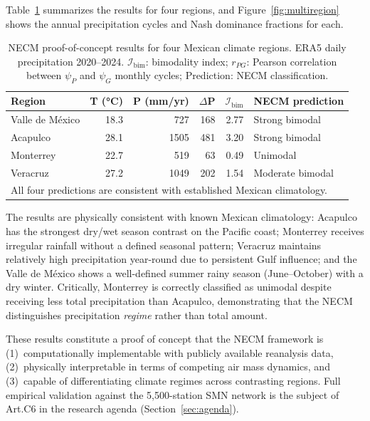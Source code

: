 \documentclass[12pt,a4paper]{article}
\begin{document}
Table~\ref{tab:proof_of_concept} summarizes the results for four
regions, and Figure~\ref{fig:multiregion} shows the annual precipitation
cycles and Nash dominance fractions for each.

\begin{table}[ht]
\centering
\small
\caption{NECM proof-of-concept results for four Mexican climate regions.
ERA5 daily precipitation 2020--2024. $\mathcal{I}_\mathrm{bim}$:
bimodality index; $r_{PG}$: Pearson correlation between $\psi_P$
and $\psi_G$ monthly cycles; Prediction: NECM classification.}
\label{tab:proof_of_concept}
\begin{tabular}{lrrrrl}
\hline
\textbf{Region} & \textbf{T (°C)} & \textbf{P (mm/yr)} &
\textbf{$\Delta$P} & \textbf{$\mathcal{I}_\mathrm{bim}$} &
\textbf{NECM prediction} \\
\hline
Valle de M\'exico & 18.3 & 727  & 168 & 2.77 & Strong bimodal \\
Acapulco          & 28.1 & 1505 & 481 & 3.20 & Strong bimodal \\
Monterrey         & 22.7 & 519  &  63 & 0.49 & Unimodal       \\
Veracruz          & 27.2 & 1049 & 202 & 1.54 & Moderate bimodal \\
\hline
\multicolumn{6}{l}{\small All four predictions are consistent with
established Mexican climatology.}\\
\hline
\end{tabular}
\end{table}

The results are physically consistent with known Mexican climatology:
Acapulco has the strongest dry/wet season contrast on the Pacific coast;
Monterrey receives irregular rainfall without a defined seasonal pattern;
Veracruz maintains relatively high precipitation year-round due to
persistent Gulf influence; and the Valle de M\'exico shows a well-defined
summer rainy season (June--October) with a dry winter. Critically,
Monterrey is correctly classified as unimodal despite receiving less
total precipitation than Acapulco, demonstrating that the NECM
distinguishes precipitation \textit{regime} rather than total amount.

These results constitute a proof of concept that the NECM framework
is (1)~computationally implementable with publicly available reanalysis
data, (2)~physically interpretable in terms of competing air mass
dynamics, and (3)~capable of differentiating climate regimes across
contrasting regions. Full empirical validation against the 5,500-station
SMN network is the subject of Art.C6 in the research agenda
(Section~\ref{sec:agenda}).
\end{document}
